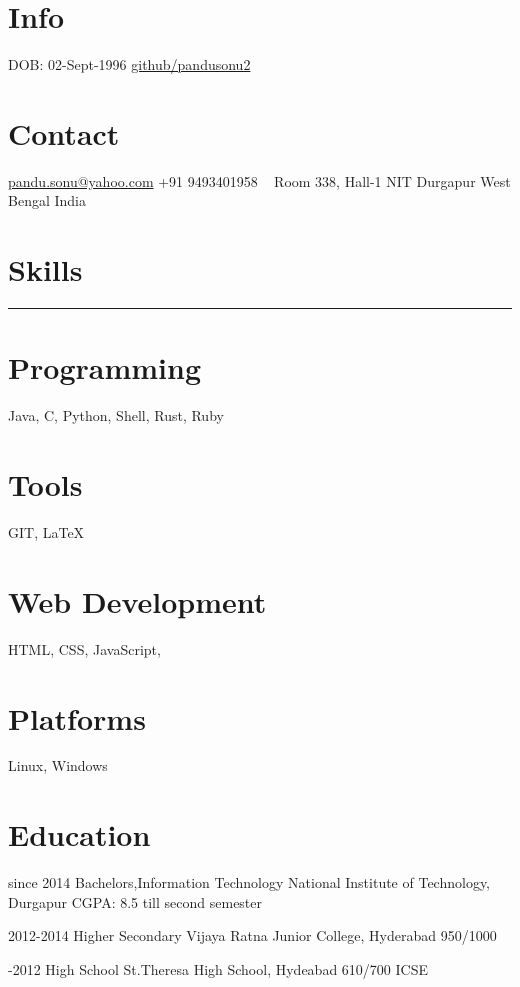 \documentclass[]{friggeri-cv-a4}
\begin{document}


\begin{aside}
\section{Info}
DOB: 02-Sept-1996
\href{http://github.com/pandusonu2}{github/pandusonu2}

\section{Contact}
\href{mailto:pandu.sonu@yahoo.com}{pandu.sonu@yahoo.com}
+91 9493401958
~
Room 338, Hall-1
NIT Durgapur
West Bengal
India
~
\section{Skills}
\noindent\rule{3cm}{0.5pt}
\section{Programming}
Java, C, Python, Shell, Rust, Ruby
\section{Tools}
GIT, \LaTeX
\section{Web Development}
HTML, CSS, JavaScript,
\section{Platforms}
Linux, Windows
\end{aside}


\section{\normalfont Education}

\begin{entrylist}

\entry
{since 2014}
{Bachelors,{\normalfont Information Technology}}
{National Institute of Technology, Durgapur}
{CGPA: 8.5 till second semester}
{}

\entry
{2012-2014}
{Higher Secondary}
{Vijaya Ratna Junior College, Hyderabad}
{950/1000}
{}

\entry
{-2012}
{High School}
{St.Theresa High School, Hydeabad}
{610/700 ICSE}
{}

\end{entrylist}
\end{document}
